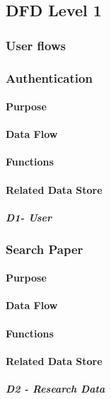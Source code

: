 \subsection{DFD Level 1}
\subsubsection{User flows}

\subsubsection*{Authentication}
\paragraph{Purpose}

\paragraph{Data Flow}

\paragraph{Functions}

\paragraph{Related Data Store}
\subparagraph{D1- User}

\subsubsection*{Search Paper}
\paragraph{Purpose}
\paragraph{Data Flow}

\paragraph{Functions}

\paragraph{Related Data Store}
\subparagraph{D2 - Research Data}

